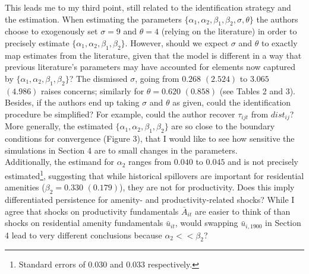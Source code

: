 \documentclass[10pt, final]{article}
\begin{document}
This leads me to my third point, still related to the identification strategy and the estimation. When estimating the parameters $\{\alpha_1, \alpha_2, \beta_1, \beta_2, \sigma, \theta\}$ the authors choose to exogenously set $\sigma = 9$ and $\theta = 4$ (relying on the literature) in order to precisely estimate $\{\alpha_1, \alpha_2, \beta_1, \beta_2\}$. However, should we expect $\sigma$ and $\theta$ to exactly map estimates from the literature, given that the model is different in a way that previous literature's parameters may have accounted for elements now captured by $\{\alpha_1, \alpha_2, \beta_1, \beta_2\}$? The dismissed $\sigma$, going from $0.268$ $(2.524)$ to $3.065$ $(4.986)$ raises concerns; similarly for $\theta = 0.620$ $(0.858)$ (see Tables 2 and 3).
Besides, if the authors end up taking $\sigma$ and $\theta$ as given, could the identification procedure be simplified? For example, could the author recover $\tau_{ijt}$ from $dist_{ij}$?
\\
More generally, the estimated $\{\alpha_1, \alpha_2, \beta_1, \beta_2\}$ are so close to the boundary conditions for convergence (Figure 3), that I would like to see how sensitive the simulations in Section 4 are to small changes in the parameters. 
\\
Additionally, the estimand for $\alpha_2$ ranges from $0.040$ to $0.045$ and is not precisely estimated\footnote{Standard errors of $0.030$ and $0.033$ respectively.}, suggesting that while historical spillovers are important for residential amenities ($\beta_2 = 0.330$ $(0.179)$), they are not for productivity. Does this imply differentiated persistence for amenity- and productivity-related shocks? While I agree that shocks on productivity fundamentals $\bar{A}_{it}$ are easier to think of than shocks on residential amenity fundamentals $\bar{u}_{it}$, would swapping $\bar{u}_{i,1900}$ in Section 4 lead to very different conclusions because $\alpha_2 << \beta_2$?  
\\
\end{document}
